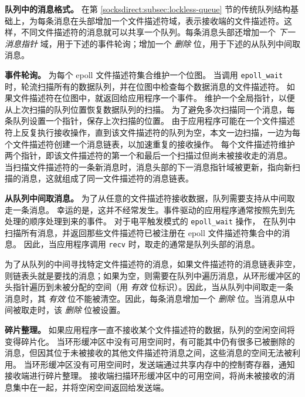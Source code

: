 \textbf{队列中的消息格式。}
在第 \ref{socksdirect:subsec:lockless-queue} 节的传统队列结构基础上，为每条消息在头部增加一个文件描述符域，表示接收端的文件描述符。这样，不同文件描述符的消息就可以共享一个队列。每条消息头部还增加一个 \textit{下一消息指针} 域，用于下述的事件轮询；增加一个 \textit{删除} 位，用于下述的从队列中间取消息。


\textbf{事件轮询。}
为每个 epoll 文件描述符集合维护一个位图。
当调用 \texttt{epoll\_wait} 时，轮流扫描所有的数据队列，并在位图中检查每个数据消息的文件描述符。
如果文件描述符在位图中，就返回给应用程序一个事件。
维护一个全局指针，以便从上次扫描的队列位置恢复数据队列的扫描。
为了避免多次扫描同一个消息，每条队列设置一个指针，保存上次扫描的位置。
由于应用程序可能在一个文件描述符上反复执行接收操作，直到该文件描述符的队列为空，本文一边扫描，一边为每个文件描述符创建一个消息链表，以加速重复的接收操作。
每个文件描述符维护两个指针，即该文件描述符的第一个和最后一个扫描过但尚未被接收走的消息。
当扫描文件描述符的一条新消息时，消息头部的下一消息指针域被更新，指向新扫描的消息，这就组成了同一文件描述符的消息链表。

\textbf{从队列中间取消息。}
为了从任意的文件描述符接收数据，队列需要支持从中间取走一条消息。
幸运的是，这并不经常发生。事件驱动的应用程序通常按照先到先处理的顺序处理到来的事件。
对于电平触发模式的 \texttt{epoll\_wait} 操作，\libipc{} 在队列中扫描所有消息，并返回那些文件描述符已被注册在 epoll 文件描述符集合中的消息。
因此，当应用程序调用 \texttt{recv} 时，取走的通常是队列头部的消息。

为了从队列的中间寻找特定文件描述符的消息，如果文件描述符的消息链表非空，则链表头就是要找的消息；如果为空，则需要在队列中遍历消息，从环形缓冲区的头指针遍历到未被分配的空间（用 \textit{有效} 位标识）。因此，当从队列中间取走一条消息时，其 \textit{有效} 位不能被清空。因此，每条消息增加一个 \textit{删除} 位。当消息从中间被取走时，该 \textit{删除} 位被设置。

\textbf{碎片整理。}
如果应用程序一直不接收某个文件描述符的数据，队列的空闲空间将变得碎片化。
当环形缓冲区中没有可用空间时，有可能其中仍有很多已被删除的消息，但因其位于未被接收的其他文件描述符消息之间，这些消息的空间无法被利用。
当环形缓冲区没有可用空间时，发送端通过共享内存中的控制寄存器，通知接收端进行碎片整理。
接收端扫描环形缓冲区中的可用空间，将尚未被接收的消息集中在一起，并将空闲空间返回给发送端。



